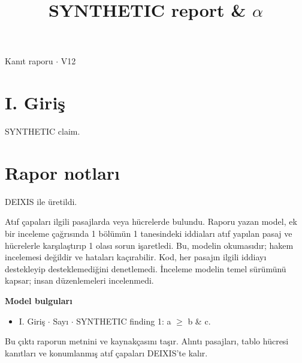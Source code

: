 \documentclass[journal]{IEEEtran}
\begin{document}
\renewcommand{\abstractname}{Özet}
\renewcommand{\IEEEkeywordsname}{Dizin Terimleri}
\renewcommand{\refname}{Kaynaklar}

\title{SYNTHETIC report \& \ensuremath{\alpha}}

\maketitle

\noindent Kanıt raporu \ensuremath{\cdot} V12

\section*{I. Giriş}

SYNTHETIC claim. \cite{Synth26}

\section*{Rapor notları}

DEIXIS ile üretildi.

Atıf çapaları ilgili pasajlarda veya hücrelerde bulundu. Raporu yazan model, ek bir inceleme çağrısında 1 bölümün 1 tanesindeki iddiaları atıf yapılan pasaj ve hücrelerle karşılaştırıp 1 olası sorun işaretledi. Bu, modelin okumasıdır; hakem incelemesi değildir ve hataları kaçırabilir. Kod, her pasajın ilgili iddiayı destekleyip desteklemediğini denetlemedi. İnceleme modelin temel sürümünü kapsar; insan düzenlemeleri incelenmedi.

\noindent\textbf{Model bulguları}

\begin{itemize}
\item I. Giriş \ensuremath{\cdot} Sayı \ensuremath{\cdot} SYNTHETIC finding 1: a \ensuremath{\geq} b \& c.
\end{itemize}

Bu çıktı raporun metnini ve kaynakçasını taşır. Alıntı pasajları, tablo hücresi kanıtları ve konumlanmış atıf çapaları DEIXIS'te kalır.




\end{document}
